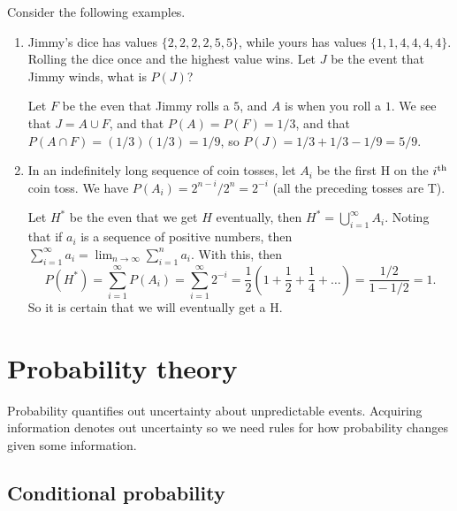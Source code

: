 \documentclass[letter-paper]{tufte-book}
\newenvironment{example}[1][Example]{\begin{trivlist}
\item[\hskip \labelsep {\bfseries #1}]}{\end{trivlist}}
\begin{document}
\begin{example}
  Consider the following examples.
  \begin{enumerate}
    \item Jimmy's dice has values $\{2,2,2,2,5,5\}$, while yours has values
    $\{1,1,4,4,4,4\}$. Rolling the dice once and the highest value wins. Let $J$
    be the event that Jimmy winds, what is $P(J)$?
    
    Let $F$ be the even that Jimmy rolls a $5$, and $A$ is when you roll a $1$.
    We see that $J=A\cup F$, and that $P(A)=P(F)=1/3$, and that $P(A\cap
    F)=(1/3)(1/3)=1/9$, so $P(J)=1/3+1/3-1/9=5/9$.
    
    \item In an indefinitely long sequence of coin tosses, let $A_i$ be the
    first H on the $i^{\textnormal{th}}$ coin toss. We have
    $P(A_i)=2^{n-i}/2^n=2^{-i}$ (all the preceding tosses are T).
    
    Let $H^*$ be the even that we get $H$ eventually, then
    $H^*=\bigcup_{i=1}^\infty A_i$. Noting that if $a_i$ is a sequence of
    positive numbers, then $\sum_{i=1}^\infty a_i =
    \lim_{n\to\infty}\sum_{i=1}^n a_i$. With this, then
    \begin{equation*}
      P(H^*)=\sum_{i=1}^\infty P(A_i)=\sum_{i=1}^\infty 2^{-i}
      =\frac{1}{2}\left(1+\frac{1}{2}+\frac{1}{4}+\ldots\right)
      =\frac{1/2}{1-1/2}=1.
    \end{equation*}
    So it is certain that we will eventually get a H.
  \end{enumerate}
\end{example}


\chapter{Probability theory}

Probability quantifies out uncertainty about unpredictable events. Acquiring
information denotes out uncertainty so we need rules for how probability changes
given some information.


\section{Conditional probability}
\end{document}

